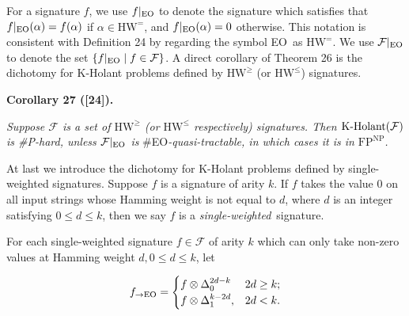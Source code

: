 


For a signature $f$, we use $f|_{\textup{{EO}}}$ to denote the signature which satisfies that $f|_{\textup{{EO}}}(\alpha)=f(\alpha)$ if $\alpha\in\text{HW}^{=}$, and $f|_{\textup{{EO}}}(\alpha)=0$ otherwise. This notation is consistent with Definition 24 by regarding the symbol EO as $\text{HW}^{=}$. We use $\mathcal{F}|_{\textup{{EO}}}$ to denote the set $\{f|_{\textup{{EO}}}\mid f\in\mathcal{F}\}$. A direct corollary of Theorem 26 is the dichotomy for K-Holant problems defined by $\text{HW}^{\geq}$ (or $\text{HW}^{\leq}$) signatures.\par





\par\medskip\noindent\textbf{
\textbf{Corollary 27}\textbf{ }([24])\textbf{.}
}\par



\emph{Suppose $\mathcal{F}$ is a set of $\text{HW}^{\geq}$ (or $\text{HW}^{\leq}$ respectively) signatures. Then $\textup{{K-Holant}}(\mathcal{F})$ is \#P-hard, unless $\mathcal{F}|_{\textup{{EO}}}$ is }\#EO\emph{-quasi-tractable, in which cases it is in $\text{FP}^{\text{NP}}$.}\par






At last we introduce the dichotomy for K-Holant problems defined by single-weighted signatures. Suppose $f$ is a signature of arity $k$. If $f$ takes the value $0$ on all input strings whose Hamming weight is not equal to $d$, where $d$ is an integer satisfying $0\leq d\leq k$, then we say $f$ is a \emph{single-weighted} signature.\par




For each single-weighted signature $f\in\mathcal{F}$ of arity $k$ which can only take non-zero values at Hamming weight $d,0\leq d\leq k$, let\par


\[\begin{gathered}
f_{\to\textup{{EO}}}=\begin{cases}f\otimes\Delta_{0}^{2d-k}&2d\geq k;\\
f\otimes\Delta_{1}^{k-2d},&2d<k.\end{cases}
\end{gathered}\]


